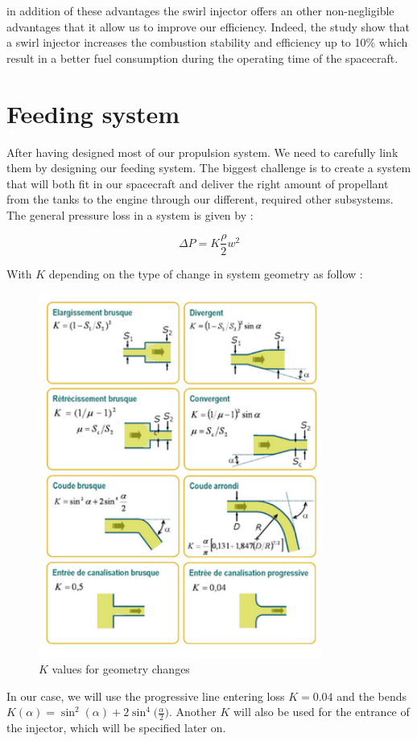 in addition of these advantages the swirl injector offers an other non-negligible advantages that it allow us to improve our efficiency. Indeed, the study show that a swirl injector increases the combustion stability and efficiency up to 10$\%$ which result in a better fuel consumption during the operating time of the spacecraft. 


\section{Feeding system}
After having designed most of our propulsion system. We need to carefully link them by designing our feeding system. The biggest challenge is to create a system that will both fit in our spacecraft and deliver the right amount of propellant from the tanks to the engine through our different, required other subsystems.\\

The general pressure loss in a system is given by :

$$
\Delta P = K\frac \rho 2 w^2
$$

With $K$ depending on the type of change in system geometry as follow : 
\begin{figure}[H]
	\centering
	\includegraphics[height=12cm]{pertecharge}
	\caption{$K$ values for geometry changes}
\end{figure}
In our case, we will use the progressive line entering loss $K = 0.04$ and the bends $ K(\alpha) = \sin^2(\alpha) + 2\sin^4\bigg(\frac\alpha 2\bigg)$. Another $K$ will also be used for the entrance of the injector, which will be specified later on.\\

